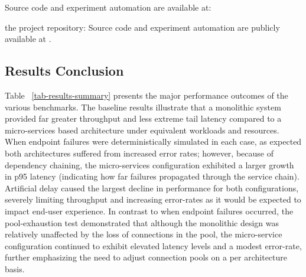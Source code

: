 \documentclass[smallextended,natbib]{svjour3}
\begin{document}
Source code and experiment automation are available at:

the project repository:
Source code and experiment automation are publicly available at \cite{repo_artifact}.

\subsection{Results Conclusion}

Table ~\ref{tab-results-summary} presents the major performance outcomes of the various benchmarks.
The baseline results illustrate that a monolithic system provided far greater throughput and less extreme tail latency compared to a micro-services based architecture under equivalent workloads and resources.
When endpoint failures were deterministically simulated in each case, as expected both architectures suffered from increased error rates; however, because of dependency chaining, the micro-services configuration exhibited a larger growth in p95 latency (indicating how far failures propagated through the service chain).
Artificial delay caused the largest decline in performance for both configurations, severely limiting throughput and increasing error-rates as it would be expected to impact end-user experience.
In contrast to when endpoint failures occurred, the pool-exhaustion test demonstrated that although the monolithic design was relatively unaffected by the loss of connections in the pool, the micro-service configuration continued to exhibit elevated latency levels and a modest error-rate, further emphasizing the need to adjust connection pools on a per architecture basis.
\end{document}
